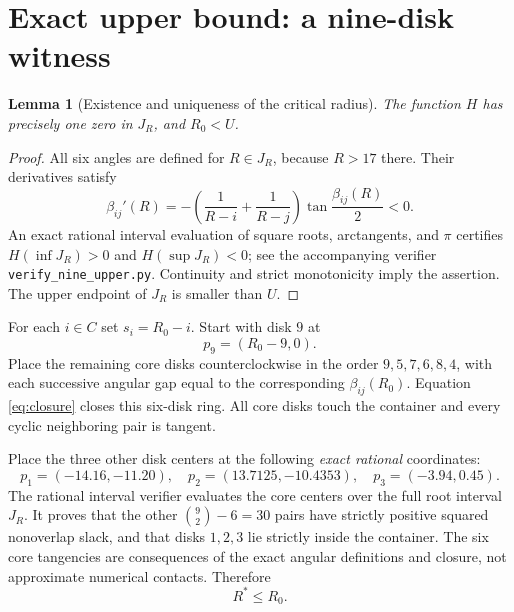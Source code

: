 \documentclass[11pt,a4paper]{article}
\newtheorem{lemma}[theorem]{Lemma}
\newcommand{\Rzero}{R_0}
\begin{document}
\section{Exact upper bound: a nine-disk witness}
\begin{lemma}[Existence and uniqueness of the critical radius]\label{lem:root}
The function $H$ has precisely one zero in $J_R$, and $\Rzero<U$.
\end{lemma}
\begin{proof}
All six angles are defined for $R\in J_R$, because $R>17$ there. Their derivatives satisfy
\[
\beta_{ij}'(R)=-\left(\frac1{R-i}+\frac1{R-j}\right)\tan\frac{\beta_{ij}(R)}2<0.
\]
An exact rational interval evaluation of square roots, arctangents, and $\pi$ certifies $H(\inf J_R)>0$ and $H(\sup J_R)<0$; see the accompanying verifier \texttt{verify\_nine\_upper.py}. Continuity and strict monotonicity imply the assertion. The upper endpoint of $J_R$ is smaller than $U$.
\end{proof}

For each $i\in C$ set $s_i=\Rzero-i$. Start with disk $9$ at
\[
p_9=(\Rzero-9,0).
\]
Place the remaining core disks counterclockwise in the order $9,5,7,6,8,4$, with each successive angular gap equal to the corresponding $\beta_{ij}(\Rzero)$. Equation \eqref{eq:closure} closes this six-disk ring. All core disks touch the container and every cyclic neighboring pair is tangent.

Place the three other disk centers at the following \emph{exact rational} coordinates:
\begin{equation}\label{eq:smallcenters}
  p_1=(-14.16,-11.20),\quad
  p_2=(13.7125,-10.4353),\quad
  p_3=(-3.94,0.45).
\end{equation}
The rational interval verifier evaluates the core centers over the full root interval $J_R$. It proves that the other $\binom92-6=30$ pairs have strictly positive squared nonoverlap slack, and that disks $1,2,3$ lie strictly inside the container. The six core tangencies are consequences of the exact angular definitions and closure, not approximate numerical contacts.
Therefore
\begin{equation}\label{eq:upper}
R^*\le\Rzero.
\end{equation}
\end{document}

